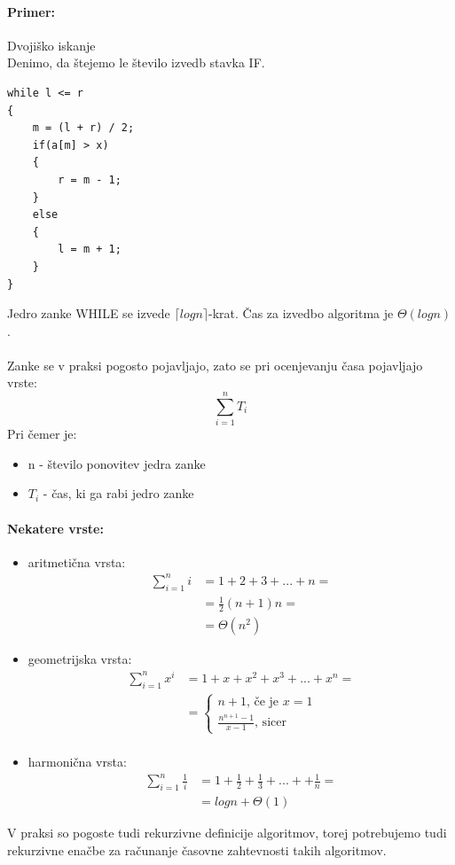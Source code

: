 \documentclass[a4paper,10pt]{article}
\begin{document}
\paragraph{Primer:}
Dvoji\v sko iskanje\\
Denimo, da \v stejemo le \v stevilo izvedb stavka IF.
\begin{lstlisting}
while l <= r
{
	m = (l + r) / 2;
	if(a[m] > x)
	{
		r = m - 1;
	}
	else
	{
		l = m + 1;
	}
}
\end{lstlisting}
Jedro zanke WHILE  se izvede $\lceil log n \rceil$-krat. \v Cas za izvedbo algoritma je $\Theta (log n)$.\\
\\
Zanke se v praksi pogosto pojavljajo, zato se pri ocenjevanju \v casa pojavljajo vrste:
$$
\sum_{i=1}^n T_i
$$
Pri \v cemer je:
\begin{itemize}
\item n - \v stevilo ponovitev jedra zanke
\item $T_i$ - \v cas, ki ga rabi jedro zanke
\end{itemize}

\paragraph{Nekatere vrste:}
\begin{itemize}
\item aritmeti\v cna vrsta:
	\begin{equation}
	\begin{array}{ll}
	\sum_{i=1}^n i & = 1 + 2 + 3 + ... + n = \\
	& = \frac{1}{2}(n+1)n = \\
	& = \Theta(n^2)
	\end{array}
	\label{aritmeticna vrsta}
	\end{equation}
\item geometrijska vrsta:
	\begin{equation}
	\begin{array}{ll}
	\sum_{i=1}^n x^i & = 1 + x + x^2 + x^3 + ... + x^n = \\
	 & = \left\lbrace 
		\begin{array}{l}
		n + 1 \mbox{, \v ce je } x=1 \\
		\frac{n^{n+1} - 1}{x - 1} \mbox{, sicer}
		\end{array}
	\right. \\
	\end{array}
	\label{geometrijska vrsta}
	\end{equation}
\item harmoni\v cna vrsta:
	\begin{equation}
	\begin{array}{ll}
	\sum_{i=1}^n \frac{1}{i} & = 1 + \frac{1}{2} + \frac{1}{3} + ... + + \frac{1}{n} = \\
	 & = log n + \Theta (1)
	\end{array}
	\label{harmonicna vrsta}
	\end{equation}
\end{itemize}
V praksi so pogoste tudi rekurzivne definicije algoritmov, torej potrebujemo tudi rekurzivne ena\v cbe za ra\v cunanje \v casovne zahtevnosti takih algoritmov.
\end{document}
